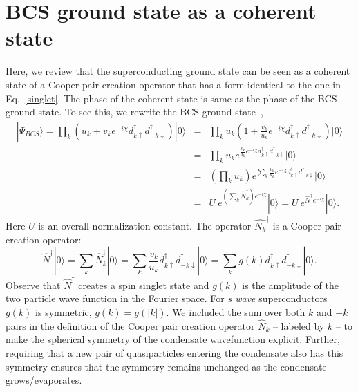 \documentclass[12pt,letterpaper,aps,onecolumn,superscriptaddress,floatfix,notitlepage]{revtex4-1}
\begin{document}
	\section{BCS ground state as a coherent state\label{Ap:bcscoherent}}
	Here, we review that the superconducting ground state can be seen as a coherent state of a Cooper pair creation operator that has a form identical to the one in Eq.~\eqref{singlet}. The phase of the coherent state is same as the phase of the BCS ground state. To see this, we rewrite the BCS ground state~\cite{annett2004superconductivity},
	\begin{eqnarray}
	|\Psi_{BCS}\rangle = 		\prod_{k}(u_{k}+v_{k}e^{-i\chi} d_{k\uparrow}^{\dagger}d_{-k\downarrow}^{\dagger})|0\rangle&=&\prod_{k}u_{k}(1+\frac{v_{k}}{u_{k}}e^{-i\chi} d_{k\uparrow}^{\dagger}d_{-k\downarrow}^{\dagger})|0\rangle\\
	&=& \prod_{k}u_{k}e^{\frac{v_{k}}{u_{k}}e^{-i\chi} d_{k\uparrow}^{\dagger}d_{-k\downarrow}^{\dagger}}|0\rangle\\
	&=& (\prod_{k}u_{k})e^{\sum\limits_{k}\frac{v_{k}}{u_{k}}e^{-i\chi} d_{k\uparrow}^{\dagger}d_{-k\downarrow}^{\dagger}}|0\rangle\\
	&=&U~e^{(\sum\limits_{k}\hat{N}_{k}^{\dagger})e^{-i\chi}}|0\rangle = U~e^{\hat{N}^{\dagger}e^{-i\chi}}|0\rangle.
	\end{eqnarray}
	Here $U$ is an overall normalization constant. The operator  $\hat{N_{k}}^{\dagger}$ is a Cooper pair creation operator:
	\begin{equation}
	\hat{N}^{\dagger}|0\rangle =\sum\limits_{k}\hat{N}_{k}^{\dagger}|0\rangle = \sum\limits_{k}\frac{v_{k}}{u_{k}} d_{k\uparrow}^{\dagger}d_{-k\downarrow}^{\dagger}|0\rangle =  \sum\limits_{k}g(k) d_{k\uparrow}^{\dagger}d_{-k\downarrow}^{\dagger}|0\rangle.	
	\end{equation}
	Observe that  $\hat{N}^{\dagger}$ creates a spin singlet state and $g(k)$ is the amplitude of the two particle wave function in the Fourier space. For \textit{s wave} superconductors $g(k)$ is symmetric, $g(k) = g(|k|)$. We included the sum over both $k$ and $-k$ pairs in the definition of the Cooper pair creation operator $\hat{N}_{k}$ -- labeled by $k$ -- to make the spherical symmetry of the condensate wavefunction explicit. Further, requiring that a new pair of quasiparticles entering the condensate also has this symmetry ensures that the symmetry remains unchanged as the condensate grows/evaporates.
	
	
\end{document}
